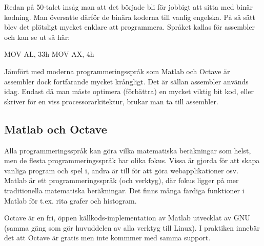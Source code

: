 Redan på 50-talet insåg man att det började bli för jobbigt att sitta med binär kodning. Man översatte därför de binära koderna till vanlig engelska. På så sätt blev det plötsligt mycket enklare att programmera. Språket kallas för assembler och kan se ut så här:
\\

\begin{pseudo}
 MOV AL, 33h
 MOV AX, 4h
\end{pseudo}

Jämfört med moderna programmeringsspråk som Matlab och Octave är assembler dock fortfarande mycket krångligt. Det är sällan assembler används idag. Endast då man måste optimera (förbättra) en mycket viktig bit kod, eller skriver för en viss processorarkitektur, brukar man ta till assembler.

\subsection{Matlab och Octave}
Alla programmeringsspråk kan göra vilka matematiska beräkningar som helst, men de flesta programmeringsspråk har olika fokus. Vissa är gjorda för att skapa vanliga program och spel i, andra är till för att göra webapplikationer osv. Matlab är ett programmeringsspråk (och verktyg), där fokus ligger på mer traditionella matematiska beräkningar. Det finns många färdiga funktioner i Matlab för t.ex. rita grafer och histogram.

Octave är en fri, öppen källkods-implementation av Matlab utvecklat av GNU (samma gäng som gör huvuddelen av alla verktyg till Linux). I praktiken innebär det att Octave är gratis men inte kommmer med samma support.
